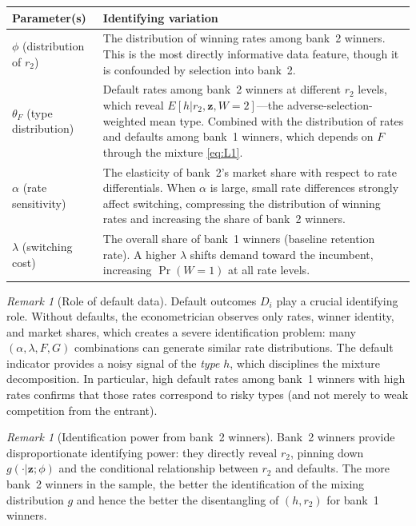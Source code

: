 \documentclass[12pt]{article}
\theoremstyle{plain}
\theoremstyle{plain}
\theoremstyle{definition}  %
\theoremstyle{remark}  %
\newtheorem{remark}[thm]{Remark}  %
\begin{document}
\begin{center}
\renewcommand{\arraystretch}{1.5}
\begin{tabular}{p{3cm}p{9.5cm}}
\toprule
\textbf{Parameter(s)} & \textbf{Identifying variation} \\
\midrule
$\phi$ \newline (distribution of $r_2$) & The distribution of winning rates among bank~2 winners. This is the most directly informative data feature, though it is confounded by selection into bank~2. \\[4pt]
$\theta_F$ \newline (type distribution) & Default rates among bank~2 winners at different $r_2$ levels, which reveal $E[h|r_2, \mathbf{z}, W\!=\!2]$---the adverse-selection-weighted mean type. Combined with the distribution of rates and defaults among bank~1 winners, which depends on $F$ through the mixture \eqref{eq:L1}. \\[4pt]
$\alpha$ \newline (rate sensitivity) & The elasticity of bank~2's market share with respect to rate differentials. When $\alpha$ is large, small rate differences strongly affect switching, compressing the distribution of winning rates and increasing the share of bank~2 winners. \\[4pt]
$\lambda$ \newline (switching cost) & The overall share of bank~1 winners (baseline retention rate). A higher $\lambda$ shifts demand toward the incumbent, increasing $\Pr(W\!=\!1)$ at all rate levels. \\
\bottomrule
\end{tabular}
\end{center}

\begin{remark}[Role of default data]\label{rem:defaults}
Default outcomes $D_i$ play a crucial identifying role. Without defaults, the econometrician observes only rates, winner identity, and market shares, which creates a severe identification problem: many $(\alpha, \lambda, F, G)$ combinations can generate similar rate distributions. The default indicator provides a noisy signal of the \emph{type} $h$, which disciplines the mixture decomposition. In particular, high default rates among bank~1 winners with high rates confirms that those rates correspond to risky types (and not merely to weak competition from the entrant).
\end{remark}

\begin{remark}[Identification power from bank~2 winners]\label{rem:bank2_id}
Bank~2 winners provide disproportionate identifying power: they directly reveal $r_2$, pinning down $g(\cdot|\mathbf{z};\phi)$ and the conditional relationship between $r_2$ and defaults. The more bank~2 winners in the sample, the better the identification of the mixing distribution $g$ and hence the better the disentangling of $(h, r_2)$ for bank~1 winners.
\end{remark}
\end{document}
